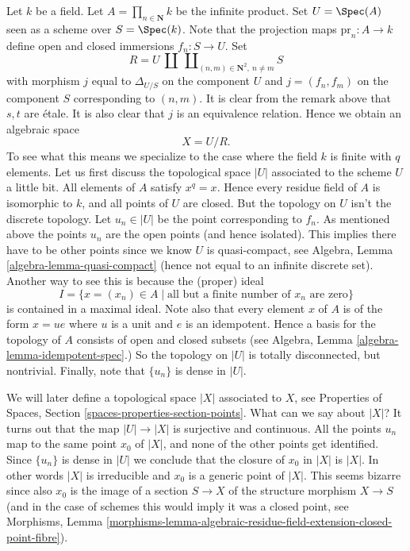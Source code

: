 \begin{example}
\label{example-infinite-product}
Let $k$ be a field.
Let $A = \prod_{n \in \mathbf{N}} k$ be the infinite product.
Set $U = \Spec(A)$ seen as a scheme over $S = \Spec(k)$.
Note that the projection maps $\text{pr}_n : A \to k$ define open
and closed immersions $f_n : S \to U$. Set
$$
R =
U
\ {\textstyle\coprod}
\ \coprod\nolimits_{(n, m) \in \mathbf{N}^2, \ n \not = m} S
$$
with morphism $j$ equal to $\Delta_{U/S}$ on the component $U$
and $j = (f_n, f_m)$ on the component $S$ corresponding to $(n, m)$.
It is clear from the remark above that $s, t$ are \'etale.
It is also clear that $j$ is an equivalence relation. Hence we
obtain an algebraic space
$$
X = U/R.
$$
To see what this means we specialize to the case where
the field $k$ is finite with $q$ elements. Let us first
discuss the topological space $|U|$ associated to the scheme $U$
a little bit. All elements of $A$ satisfy $x^q = x$.
Hence every residue field of $A$ is isomorphic to $k$, and
all points of $U$ are closed. But the topology on $U$ isn't
the discrete topology. Let $u_n \in |U|$ be the point corresponding
to $f_n$. As mentioned above the points $u_n$ are
the open points (and hence isolated). This implies there have
to be other points since we know $U$ is quasi-compact, see
Algebra, Lemma \ref{algebra-lemma-quasi-compact}
(hence not equal to an infinite discrete set).
Another way to see this is because the (proper) ideal
$$
I =
\{x = (x_n) \in A \mid \text{all but a finite number of }x_n\text{ are zero}\}
$$
is contained in a maximal ideal. Note also that every element
$x$ of $A$ is of the form $x = ue$ where $u$ is a unit and $e$ is an
idempotent. Hence a basis for the topology of $A$ consists of open and
closed subsets (see Algebra, Lemma \ref{algebra-lemma-idempotent-spec}.)
So the topology on $|U|$ is totally disconnected, but nontrivial.
Finally, note that $\{u_n\}$ is dense in $|U|$.

\medskip\noindent
We will later define a topological space $|X|$ associated to $X$, see
Properties of Spaces, Section \ref{spaces-properties-section-points}.
What can we say about $|X|$?
It turns out that the map $|U| \to |X|$ is surjective and continuous.
All the points $u_n$ map to the same point $x_0$ of $|X|$, and none of
the other points get identified. Since $\{u_n\}$ is dense in $|U|$ we
conclude that the closure of $x_0$ in $|X|$ is $|X|$. In other words
$|X|$ is irreducible and $x_0$ is a generic point of $|X|$. This seems
bizarre since also $x_0$ is the image of a section
$S \to X$ of the structure morphism $X \to S$ (and in the case of
schemes this would imply it was a closed point, see
Morphisms, Lemma
\ref{morphisms-lemma-algebraic-residue-field-extension-closed-point-fibre}).
\end{example}


